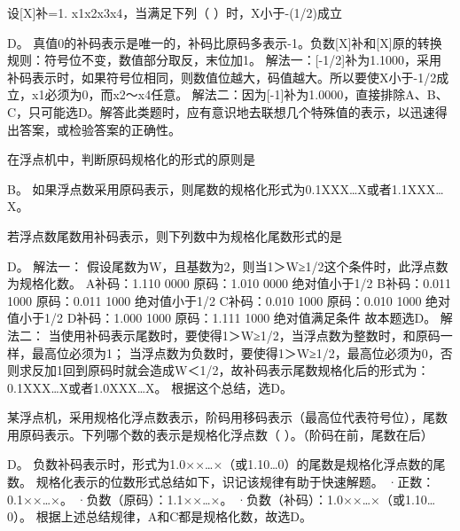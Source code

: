 \question 设{[}X{]}补=1. x1x2x3x4，当满足下列（ ）时，X小于-(1/2)成立
\par{}
\begin{solution}D。
真值0的补码表示是唯一的，补码比原码多表示-1。负数{[}X{]}补和{[}X{]}原的转换规则：符号位不变，数值部分取反，末位加1。
解法一：{[}-1/2{]}补为1.1000，采用补码表示时，如果符号位相同，则数值位越大，码值越大。所以要使X小于-1/2成立，x1必须为0，而x2～x4任意。
解法二：因为{[}-1{]}补为1.0000，直接排除A、B、C，只可能选D。解答此类题时，应有意识地去联想几个特殊值的表示，以迅速得出答案，或检验答案的正确性。
\end{solution}
\question 在浮点机中，判断原码规格化的形式的原则是
\par{}
\begin{solution}B。
如果浮点数采用原码表示，则尾数的规格化形式为0.1XXX\ldots{}X或者1.1XXX\ldots{}X。
\end{solution}
\question 若浮点数尾数用补码表示，则下列数中为规格化尾数形式的是
\par{}
\begin{solution}D。 解法一：
假设尾数为W，且基数为2，则当1＞\textbar{}W\textbar{}≥1/2这个条件时，此浮点数为规格化数。
A补码：1.110 0000 原码：1.010 0000 绝对值小于1/2 B补码：0.011 1000
原码：0.011 1000 绝对值小于1/2 C补码：0.010 1000 原码：0.010 1000
绝对值小于1/2 D补码：1.000 1000 原码：1.111 1000 绝对值满足条件
故本题选D。 解法二：
当使用补码表示尾数时，要使得1＞\textbar{}W\textbar{}≥1/2，当浮点数为整数时，和原码一样，最高位必须为1；
当浮点数为负数时，要使得1＞\textbar{}W\textbar{}≥1/2，最高位必须为0，否则求反加1回到原码时就会造成\textbar{}W\textbar{}＜1/2，故补码表示尾数规格化后的形式为：0.1XXX\ldots{}X或者1.0XXX\ldots{}X。
根据这个总结，选D。
\end{solution}
\question 某浮点机，采用规格化浮点数表示，阶码用移码表示（最高位代表符号位），尾数用原码表示。下列哪个数的表示是规格化浮点数（
）。（阶码在前，尾数在后）
\par{}
\begin{solution}D。
负数补码表示时，形式为1.0××\ldots{}×（或1.10\ldots{}0）的尾数是规格化浮点数的尾数。
规格化表示的位数形式总结如下，识记该规律有助于快速解题。
·正数：0.1××\ldots{}×。 ·负数（原码）：1.1××\ldots{}×。
·负数（补码）：1.0××\ldots{}×（或1.10\ldots{}0）。
根据上述总结规律，A和C都是规格化数，故选D。
\end{solution}
